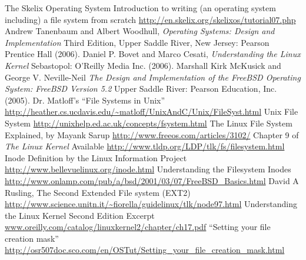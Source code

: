 \documentclass{article}
\begin{document}
\begin{thebibliography}{10}
 The Skelix Operating System Introduction to writing (an operating system including) a file system from scratch \url{http://en.skelix.org/skelixos/tutorial07.php}
 Andrew Tanenbaum and Albert Woodhull, \textit{Operating Systems: Design and Implementation} Third Edition, Upper Saddle River, New Jersey: Pearson Prentice Hall (2006).
 Daniel P. Bovet and Marco Cesati, \textit{Understanding the Linux Kernel} Sebastopol: O'Reilly Media Inc. (2006).
 Marshall Kirk McKusick and George V. Neville-Neil \textit{The Design and Implementation of the FreeBSD Operating System: FreeBSD Version 5.2} Upper Saddle River: Pearson Education, Inc. (2005).
 Dr. Matloff's ``File Systems in Unix'' \url{http://heather.cs.ucdavis.edu/~matloff/UnixAndC/Unix/FileSyst.html} 
 Unix File System \url{http://unixhelp.ed.ac.uk/concepts/fsystem.html}
 The Linux File System Explained, by Mayank Sarup \url{http://www.freeos.com/articles/3102/}
 Chapter 9 of \textit{The Linux Kernel} Available \url{http://www.tldp.org/LDP/tlk/fs/filesystem.html}
 Inode Definition by the Linux Information Project \url{http://www.bellevuelinux.org/inode.html}
 Understanding the Filesystem Inodes \url{http://www.onlamp.com/pub/a/bsd/2001/03/07/FreeBSD_Basics.html}
 David A Rusling, The Second Extended File system (EXT2) \url{http://www.science.unitn.it/~fiorella/guidelinux/tlk/node97.html}
 Understanding the Linux Kernel Second Edition Excerpt \url{www.oreilly.com/catalog/linuxkernel2/chapter/ch17.pdf}
 ``Setting your file creation mask'' \url{http://osr507doc.sco.com/en/OSTut/Setting_your_file_creation_mask.html}
\end{thebibliography}
\end{document}
